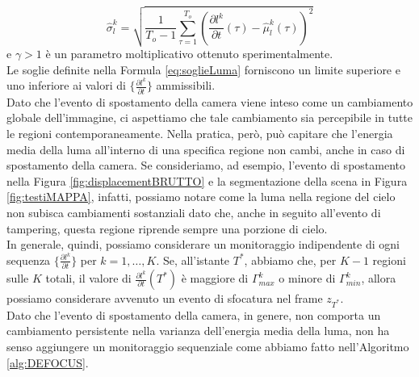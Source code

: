 \begin{equation}
\hat{\sigma}_l^k  = \sqrt{\frac{1}{T_{o}-1}\sum_{\tau=1}^{T_{o}}\left(\frac{\partial l^k}{\partial t}(\tau) - \hat{\mu}_l^k(\tau)\right)^2} \nonumber
\end{equation}
e $\gamma>1$ \`e un parametro moltiplicativo ottenuto sperimentalmente.\\
Le soglie definite nella Formula \eqref{eq:soglieLuma} forniscono un limite superiore e uno inferiore ai valori di $\{\frac{\partial l^k}{\partial t}\}$ ammissibili.\\
Dato che l'evento di spostamento della camera viene inteso come un cambiamento globale dell'immagine, ci aspettiamo che tale cambiamento sia percepibile in tutte le regioni contemporaneamente. 
Nella pratica, per\`o, pu\`o capitare che l'energia media della luma all'interno di una specifica regione non cambi, anche in caso di spostamento della camera.
Se consideriamo, ad  esempio, l'evento di spostamento nella Figura \ref{fig:displacementBRUTTO} e la segmentazione della scena in Figura \ref{fig:testiMAPPA}, infatti, possiamo notare come la luma nella regione del cielo non subisca cambiamenti sostanziali dato che, anche in seguito all'evento di tampering, questa regione riprende sempre una porzione di cielo.\\
In generale, quindi, possiamo considerare un monitoraggio indipendente di ogni sequenza $\{\frac{\partial l^k}{\partial t}\}$ per $k=1,\dots,K$.
Se, all'istante $T^*$, abbiamo che, per $K-1$ regioni sulle $K$ totali, il valore di $\frac{\partial l^k}{\partial t}(T^*)$ \`e maggiore di $\Gamma_{max}^k$ o minore di $\Gamma_{min}^k$, allora possiamo considerare avvenuto un evento di sfocatura nel frame $z_{T^*}$. \\ 
Dato che l'evento di spostamento della camera, in genere, non comporta un cambiamento persistente nella varianza dell'energia media della luma, non ha senso aggiungere un monitoraggio sequenziale come abbiamo fatto nell'Algoritmo \ref{alg:DEFOCUS}.
